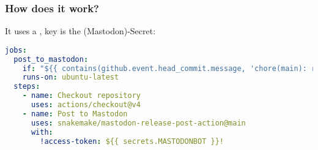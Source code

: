 \begin{frame}[fragile]
	\frametitle{How does it work?}
	It uses a , key is the (Mastodon)-Secret:
	
			\begin{lstlisting}[language=yaml,basicstyle=\small\ttfamily\relax]
jobs:
  post_to_mastodon:
    if: "${{ contains(github.event.head_commit.message, 'chore(main): release') }}"
    runs-on: ubuntu-latest 
  steps: 
    - name: Checkout repository
      uses: actions/checkout@v4
    - name: Post to Mastodon
      uses: snakemake/mastodon-release-post-action@main 
      with:
        !access-token: ${{ secrets.MASTODONBOT }}!
		    \end{lstlisting}

\end{frame}